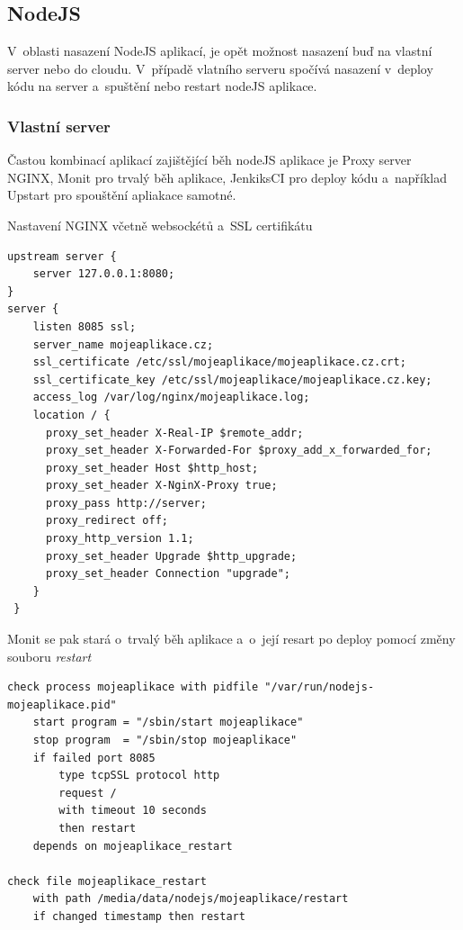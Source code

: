 \documentclass[a4paper,12pt,twoside,BCOR=10mm]{article}
\renewcommand{\it}[1]{\textit{#1}}    %
\newenvironment{codeframe}{%
  \begin{Sbox} 
    \begin{minipage} 
      {\columnwidth-\leftmargin-\rightmargin-2\fboxsep-2\fboxrule-4pt} 
}{%

  \end{minipage} 
  \end{Sbox} 
  \begin{center} 
    \fcolorbox{black}{codeback}{\TheSbox} 
  \end{center} 
}
\begin{document}
\subsection{NodeJS}
V~oblasti nasazení NodeJS aplikací, je opět možnost nasazení buď na vlastní server nebo do cloudu. V~případě vlatního serveru spočívá nasazení v~deploy kódu na server a~spuštění nebo restart nodeJS aplikace.\\

\subsubsection{Vlastní server}
Častou kombinací aplikací zajištějící běh nodeJS aplikace je Proxy server NGINX, Monit pro trvalý běh aplikace, JenkiksCI pro deploy kódu a~například Upstart pro spouštění apliakace samotné.

Nastavení NGINX včetně websockétů a~SSL certifikátu
\begin{codeframe}
  \begin{verbatim}
upstream server {
    server 127.0.0.1:8080;
}
server {
    listen 8085 ssl;
    server_name mojeaplikace.cz;
    ssl_certificate /etc/ssl/mojeaplikace/mojeaplikace.cz.crt;
    ssl_certificate_key /etc/ssl/mojeaplikace/mojeaplikace.cz.key;
    access_log /var/log/nginx/mojeaplikace.log;
    location / {
      proxy_set_header X-Real-IP $remote_addr;
      proxy_set_header X-Forwarded-For $proxy_add_x_forwarded_for;
      proxy_set_header Host $http_host;
      proxy_set_header X-NginX-Proxy true;
      proxy_pass http://server;
      proxy_redirect off;
      proxy_http_version 1.1;
      proxy_set_header Upgrade $http_upgrade;
      proxy_set_header Connection "upgrade";
    }
 }
  \end{verbatim}
\end{codeframe}

Monit se pak stará o~trvalý běh aplikace a~o~její resart po deploy pomocí změny souboru \it{restart}
\begin{codeframe}
  \begin{verbatim}
check process mojeaplikace with pidfile "/var/run/nodejs-mojeaplikace.pid"
    start program = "/sbin/start mojeaplikace"
    stop program  = "/sbin/stop mojeaplikace"
    if failed port 8085
        type tcpSSL protocol http
        request /
        with timeout 10 seconds
        then restart
    depends on mojeaplikace_restart

check file mojeaplikace_restart
    with path /media/data/nodejs/mojeaplikace/restart
    if changed timestamp then restart
  \end{verbatim}
\end{codeframe}
\end{document}
